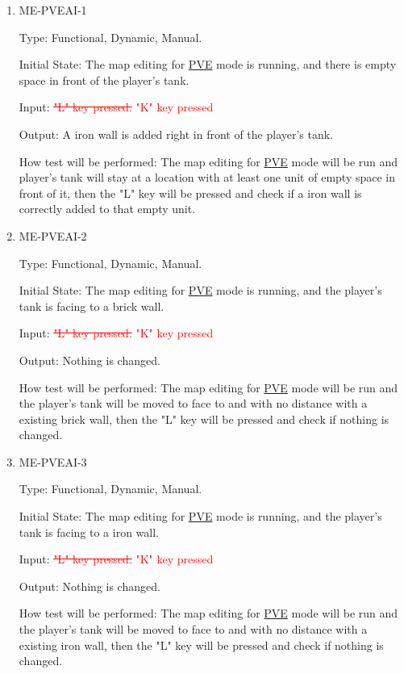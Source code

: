 \documentclass[12pt, titlepage]{article}
\begin{document}
\begin{enumerate}

\item{ME-PVEAI-1\\}

Type: Functional, Dynamic, Manual.
					
Initial State: The map editing for \underline{PVE} mode is running, and there is empty space in front of the player's tank.
					
Input: \textcolor{red}{\sout{"L" key pressed.}} \textcolor{red}{"K" key pressed}
					
Output: A iron wall is added right in front of the player's tank.
					
How test will be performed: The map editing for \underline{PVE} mode will be run and player's tank will stay at a location with at least one unit of empty space in front of it, then the "L" key will be pressed and check if a iron wall is correctly added to that empty unit.

\item{ME-PVEAI-2\\}

Type: Functional, Dynamic, Manual.
					
Initial State: The map editing for \underline{PVE} mode is running, and the player's tank is facing to a brick wall.
					
Input: \textcolor{red}{\sout{"L" key pressed.}} \textcolor{red}{"K" key pressed}
					
Output: Nothing is changed.
					
How test will be performed: The map editing for \underline{PVE} mode will be run and the player's tank will be moved to face to and with no distance with a existing brick wall, then the "L" key will be pressed and check if nothing is changed.

\item{ME-PVEAI-3\\}

Type: Functional, Dynamic, Manual.
					
Initial State: The map editing for \underline{PVE} mode is running, and the player's tank is facing to a iron wall.
					
Input: \textcolor{red}{\sout{"L" key pressed.}} \textcolor{red}{"K" key pressed}
					
Output: Nothing is changed.
					
How test will be performed: The map editing for \underline{PVE} mode will be run and the player's tank will be moved to face to and with no distance with a existing iron wall, then the "L" key will be pressed and check if nothing is changed.


\end{enumerate}
\end{document}
